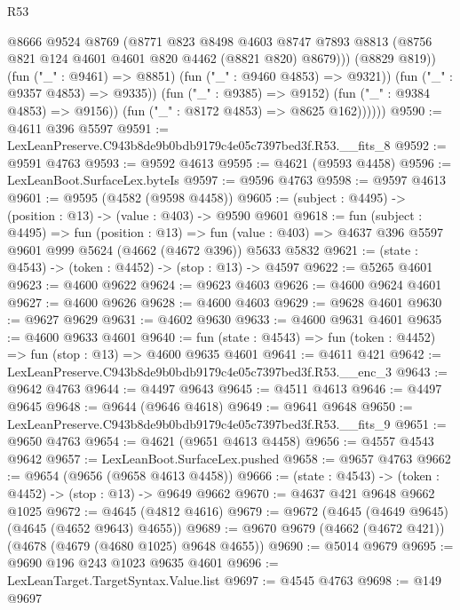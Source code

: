 \begin{lexlean}{R53}
\begin{coremodule}
                        @8666
                        @9524
                        @8769
                        (@8771
                          @823
                          @8498
                          @4603
                          @8747
                          @7893
                          @8813
                          (@8756 @821 @124 @4601 @4601 @820 @4462 (@8821 @820) @8679)))
                      (@8829 @819))
                    (fun ("_" : @9461) => @8851)
                    (fun ("_" : @9460 @4853) => @9321))
                  (fun ("_" : @9357 @4853) => @9335))
                (fun ("_" : @9385) => @9152)
                (fun ("_" : @9384 @4853) => @9156))
              (fun ("_" : @8172 @4853) => @8625 @162))))))
@9590 := @4611 @396 @5597
@9591 := LexLeanPreserve.C943b8de9b0bdb9179c4e05c7397bed3f.R53.__fits_8
@9592 := @9591 @4763
@9593 := @9592 @4613
@9595 := @4621 (@9593 @4458)
@9596 := LexLeanBoot.SurfaceLex.byteIs
@9597 := @9596 @4763
@9598 := @9597 @4613
@9601 := @9595 (@4582 (@9598 @4458))
@9605 := (subject : @4495) -> (position : @13) -> (value : @403) -> @9590 @9601
@9618 := fun (subject : @4495) =>
  fun (position : @13) =>
  fun (value : @403) => @4637 @396 @5597 @9601 @999 @5624 (@4662 (@4672 @396)) @5633 @5832
@9621 := (state : @4543) -> (token : @4452) -> (stop : @13) -> @4597
@9622 := @5265 @4601
@9623 := @4600 @9622
@9624 := @9623 @4603
@9626 := @4600 @9624 @4601
@9627 := @4600 @9626
@9628 := @4600 @4603
@9629 := @9628 @4601
@9630 := @9627 @9629
@9631 := @4602 @9630
@9633 := @4600 @9631 @4601
@9635 := @4600 @9633 @4601
@9640 := fun (state : @4543) => fun (token : @4452) => fun (stop : @13) => @4600 @9635 @4601
@9641 := @4611 @421
@9642 := LexLeanPreserve.C943b8de9b0bdb9179c4e05c7397bed3f.R53.__enc_3
@9643 := @9642 @4763
@9644 := @4497 @9643
@9645 := @4511 @4613
@9646 := @4497 @9645
@9648 := @9644 (@9646 @4618)
@9649 := @9641 @9648
@9650 := LexLeanPreserve.C943b8de9b0bdb9179c4e05c7397bed3f.R53.__fits_9
@9651 := @9650 @4763
@9654 := @4621 (@9651 @4613 @4458)
@9656 := @4557 @4543 @9642
@9657 := LexLeanBoot.SurfaceLex.pushed
@9658 := @9657 @4763
@9662 := @9654 (@9656 (@9658 @4613 @4458))
@9666 := (state : @4543) -> (token : @4452) -> (stop : @13) -> @9649 @9662
@9670 := @4637 @421 @9648 @9662 @1025
@9672 := @4645 (@4812 @4616)
@9679 := @9672 (@4645 (@4649 @9645) (@4645 (@4652 @9643) @4655))
@9689 := @9670 @9679 (@4662 (@4672 @421)) (@4678 (@4679 (@4680 @1025) @9648 @4655))
@9690 := @5014 @9679
@9695 := @9690 @196 @243 @1023 @9635 @4601
@9696 := LexLeanTarget.TargetSyntax.Value.list
@9697 := @4545 @4763
@9698 := @149 @9697

\end{coremodule}
\end{lexlean}
